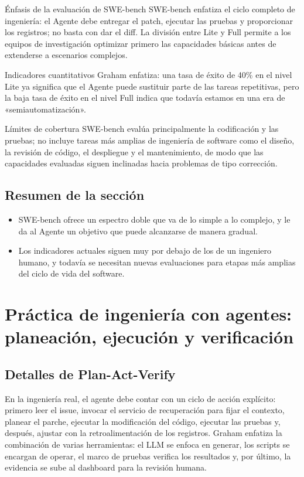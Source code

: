 \documentclass[a4paper]{article}
\begin{document}
\begin{knowledgebox}{Énfasis de la evaluación de SWE-bench}
SWE-bench enfatiza el ciclo completo de ingeniería: el Agente debe entregar el patch, ejecutar las pruebas y proporcionar los registros; no basta con dar el diff. La división entre Lite y Full permite a los equipos de investigación optimizar primero las capacidades básicas antes de extenderse a escenarios complejos.
\end{knowledgebox}

\begin{importantbox}{Indicadores cuantitativos}
Graham enfatiza: una tasa de éxito de 40\% en el nivel Lite ya significa que el Agente puede sustituir parte de las tareas repetitivas, pero la baja tasa de éxito en el nivel Full indica que todavía estamos en una era de «semiautomatización».
\end{importantbox}

\begin{warningbox}{Límites de cobertura}
SWE-bench evalúa principalmente la codificación y las pruebas; no incluye tareas más amplias de ingeniería de software como el diseño, la revisión de código, el despliegue y el mantenimiento, de modo que las capacidades evaluadas siguen inclinadas hacia problemas de tipo corrección.
\end{warningbox}

\subsection{Resumen de la sección}
\begin{itemize}
    \item SWE-bench ofrece un espectro doble que va de lo simple a lo complejo, y le da al Agente un objetivo que puede alcanzarse de manera gradual.
    \item Los indicadores actuales siguen muy por debajo de los de un ingeniero humano, y todavía se necesitan nuevas evaluaciones para etapas más amplias del ciclo de vida del software.
\end{itemize}
\section{Práctica de ingeniería con agentes: planeación, ejecución y verificación}
\subsection{Detalles de Plan-Act-Verify}
En la ingeniería real, el agente debe contar con un ciclo de acción explícito: primero leer el issue, invocar el servicio de recuperación para fijar el contexto, planear el parche, ejecutar la modificación del código, ejecutar las pruebas y, después, ajustar con la retroalimentación de los registros. Graham enfatiza la combinación de varias herramientas: el LLM se enfoca en generar, los scripts se encargan de operar, el marco de pruebas verifica los resultados y, por último, la evidencia se sube al dashboard para la revisión humana.
\end{document}

